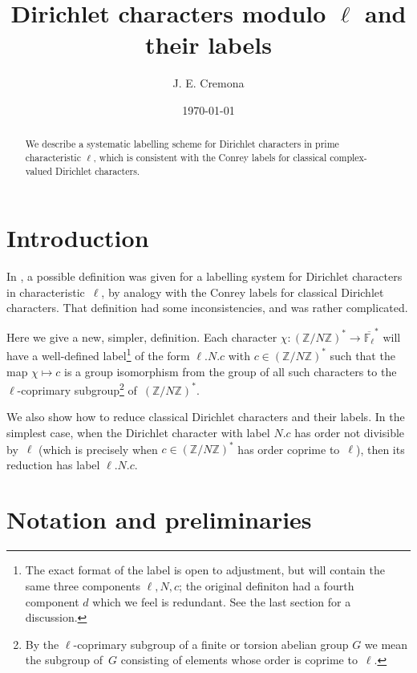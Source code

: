 \documentclass[a4paper, 10pt]{amsart}
\def\Z{{\mathbb Z}}
\def\Flbar{\overline{{\mathbb F}_{\ell}}}
\def\ZNs{(\Z/N\Z)^*}
\newcommand{\CLab}[2]{$#1.#2$}
\newcommand{\DLab}[3]{$#1.#2.#3$}
\begin{document}
\title{Dirichlet characters modulo $\ell$ and their labels}

\author{J. E. Cremona}
\address{Mathematics Institute, University of Warwick, Coventry CV4 7AL, UK}
\date{\today}

\begin {abstract}
We describe a systematic labelling scheme for Dirichlet characters in
prime characteristic $\ell$, which is consistent with the Conrey
labels for classical complex-valued Dirichlet characters.
\end {abstract}

\maketitle


\section{Introduction}
In \cite{OldDef}, a possible definition was given for a labelling
system for Dirichlet characters in characteristic~$\ell$, by analogy
with the Conrey labels for classical Dirichlet characters.  That
definition had some inconsistencies, and was rather complicated.

Here we give a new, simpler, definition.  Each character
$\chi:\ZNs\to\Flbar^*$ will have a well-defined label\footnote{The
  exact format of the label is open to adjustment, but will contain
  the same three components $\ell,N,c$; the original definiton had a
  fourth component $d$ which we feel is redundant.  See the last
  section for a discussion.} of the form \DLab{\ell}{N}{c} with
$c\in\ZNs$ such that the map $\chi\mapsto c$ is a group isomorphism
from the group of all such characters to the $\ell$-coprimary
subgroup\footnote{By the $\ell$-coprimary subgroup of a finite or
  torsion abelian group $G$ we mean the subgroup of~$G$ consisting of
  elements whose order is coprime to~$\ell$.} of~$\ZNs$.

We also show how to reduce classical Dirichlet characters and their
labels.  In the simplest case, when the Dirichlet character with label
\CLab{N}{c} has order not divisible by~$\ell$ (which is precisely
when $c\in\ZNs$ has order coprime to~$\ell$), then its reduction
has label \DLab{\ell}{N}{c}.

\section{Notation and preliminaries}
\end{document}
